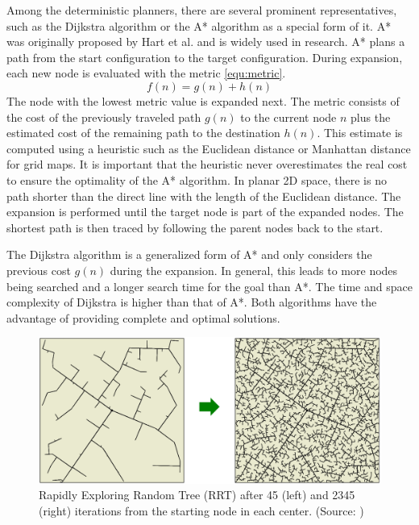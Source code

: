Among the deterministic planners, there are several prominent representatives, such as the Dijkstra algorithm or the A* algorithm as a special form of it. A* was originally proposed by Hart et al. \cite{hart_formal_1968} and is widely used in research. A* plans a path from the start configuration to the target configuration. During expansion, each new node is evaluated with the metric \ref{equ:metric}. 
\begin{equation} \label{equ:metric}
    f(n) = g(n) + h(n)
\end{equation}
The node with the lowest metric value is expanded next. The metric consists of the cost of the previously traveled path \(g(n)\) to the current node \(n\) plus the estimated cost of the remaining path to the destination \(h(n)\). This estimate is computed using a heuristic such as the Euclidean distance or Manhattan distance for grid maps. It is important that the heuristic never overestimates the real cost to ensure the optimality of the A* algorithm. In planar 2D space, there is no path shorter than the direct line with the length of the Euclidean distance. The expansion is performed until the target node is part of the expanded nodes. The shortest path is then traced by following the parent nodes back to the start.

The Dijkstra algorithm \cite{dijkstra_note_1959} is a generalized form of A* and only considers the previous cost \(g(n)\) during the expansion. In general, this leads to more nodes being searched and a longer search time for the goal than A*. The time and space complexity of Dijkstra is higher than that of A*. Both algorithms have the advantage of providing complete and optimal solutions.

\begin{figure}[h]
    \centering
    \includegraphics[width=1\textwidth]{figures/20_state_of_the_art/rrt.png}
    \caption[The RRT algorithm]{Rapidly Exploring Random Tree (RRT) after 45 (left) and 2345 (right) iterations from the starting node in each center. (Source: \cite{burgard_introduction_2021})}
    \label{fig:rrt}
\end{figure}

